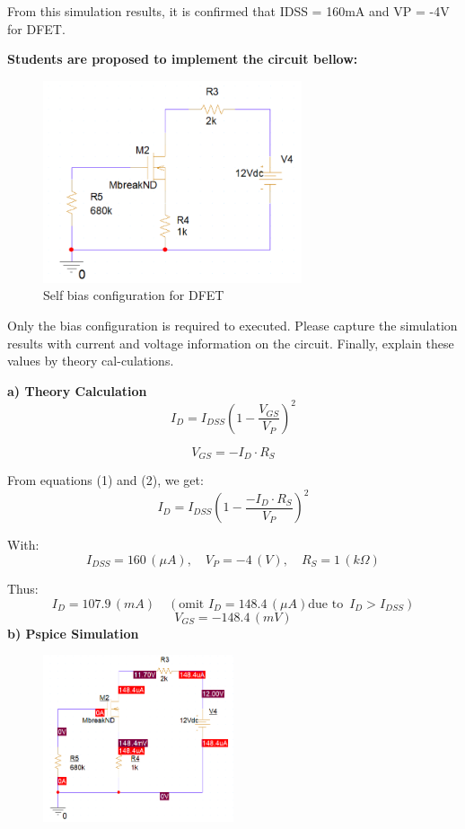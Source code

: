From this simulation results, it is confirmed that IDSS = 160mA and VP = -4V for DFET.

\textbf{Students are proposed to implement the circuit bellow:}
\begin{figure}[!htp]
    \centering
    \includegraphics[width = 3in]{graphics/ex2/f3.png}
    \caption{Self bias configuration for DFET}
    \label{dfet_3}
\end{figure}



Only the bias configuration is required to executed. Please capture the simulation results with current and voltage information on the circuit. Finally, explain these values by theory cal-culations.

\textbf{a) Theory Calculation}
\begin{equation}
    I_D = I_{DSS} \left( 1 - \frac{V_{GS}}{V_P} \right)^2 \tag{1}
\end{equation}

\begin{equation}
    V_{GS} = -I_D \cdot R_S \tag{2}
\end{equation}

From equations (1) and (2), we get:
\begin{equation}
    I_D = I_{DSS} \left( 1 - \frac{-I_D \cdot R_S}{V_P} \right)^2
\end{equation}

With:
\[
    I_{DSS} = 160 \, (\mu A), \quad V_P = -4 \, (V), \quad R_S = 1 \, (k\Omega)
\]

Thus:
\[
    I_D = 107.9 \, (mA) \quad (\text{omit } I_D = 148.4 \, (\mu A) \text{due to } \, I_D > I_{DSS})
\]
\[
    V_{GS} = -148.4 \, (mV)
\]
\textbf{b) Pspice Simulation}
\begin{figure}[!htp]
    \centering
    \includegraphics[width=0.5\textwidth]{graphics/ex2/f4.PNG}
\end{figure}

